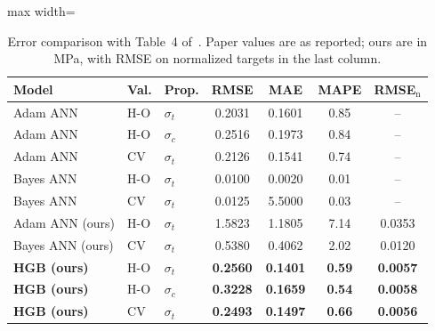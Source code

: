 \documentclass[conference,12pt]{IEEEtran}
\newcommand{\st}{\ensuremath{\sigma_t}}
\newcommand{\sco}{\ensuremath{\sigma_c}}
\begin{document}
\begin{table}[!t]
\caption{Error comparison with Table~4 of~\cite{munshi2026}. Paper values are as reported; ours are in MPa, with RMSE on normalized targets in the last column.}
\label{tab:errors}
\centering
\setlength{\tabcolsep}{2.6pt}
\begin{adjustbox}{max width=\columnwidth}
\begin{tabular}{@{}lllcccc@{}}
\toprule
Model & Val. & Prop. & RMSE & MAE & MAPE & RMSE$_{\mathrm{n}}$ \\
\midrule
Adam ANN~\cite{munshi2026} & H-O & \st & 0.2031 & 0.1601 & 0.85 & -- \\
Adam ANN~\cite{munshi2026} & H-O & \sco & 0.2516 & 0.1973 & 0.84 & -- \\
Adam ANN~\cite{munshi2026} & CV & \st & 0.2126 & 0.1541 & 0.74 & -- \\
Bayes ANN~\cite{munshi2026} & H-O & \st & 0.0100 & 0.0020 & 0.01 & -- \\
Bayes ANN~\cite{munshi2026} & CV & \st & 0.0125 & 5.5000 & 0.03 & -- \\
\midrule
Adam ANN (ours) & H-O & \st & 1.5823 & 1.1805 & 7.14 & 0.0353 \\
Bayes ANN (ours) & CV & \st & 0.5380 & 0.4062 & 2.02 & 0.0120 \\
\textbf{HGB (ours)} & H-O & \st & \textbf{0.2560} & \textbf{0.1401} & \textbf{0.59} & \textbf{0.0057} \\
\textbf{HGB (ours)} & H-O & \sco & \textbf{0.3228} & \textbf{0.1659} & \textbf{0.54} & \textbf{0.0058} \\
\textbf{HGB (ours)} & CV & \st & \textbf{0.2493} & \textbf{0.1497} & \textbf{0.66} & \textbf{0.0056} \\
\bottomrule
\end{tabular}
\end{adjustbox}
\end{table}
\end{document}

